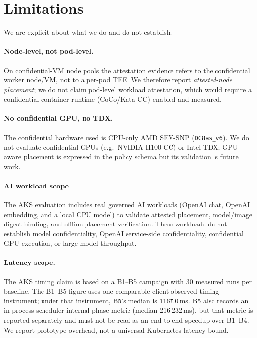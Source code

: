 \section{Limitations}
\label{sec:limitations}

We are explicit about what we do and do not establish.

\paragraph{Node-level, not pod-level.}
On confidential-VM node pools the attestation evidence refers to the confidential
worker node/VM, not to a per-pod TEE. We therefore report \emph{attested-node
placement}; we do not claim pod-level workload attestation, which would require a
confidential-container runtime (CoCo/Kata-CC) enabled and measured.

\paragraph{No confidential GPU, no TDX.}
The confidential hardware used is CPU-only AMD SEV-SNP (\texttt{DC8as\_v6}). We do
not evaluate confidential GPUs (e.g.\ NVIDIA H100 CC) or Intel TDX; GPU-aware
placement is expressed in the policy schema but its validation is future work.

\paragraph{AI workload scope.}
The AKS evaluation includes real governed AI workloads (OpenAI chat, OpenAI
embedding, and a local CPU model) to validate attested placement, model/image
digest binding, and offline placement verification. These workloads do not
establish model confidentiality, OpenAI service-side confidentiality,
confidential GPU execution, or large-model throughput.

\paragraph{Latency scope.}
The AKS timing claim is based on a B1--B5 campaign with 30 measured runs per
baseline. The B1--B5 figure uses one comparable client-observed timing
instrument; under that instrument, B5's median is 1167.0\,ms. B5 also records
an in-process scheduler-internal phase metric (median 216.232\,ms), but that
metric is reported separately and must not be read as an end-to-end speedup over
B1--B4. We report prototype overhead, not a universal Kubernetes latency bound.

